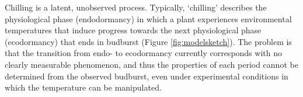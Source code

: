 \documentclass[11pt]{article}
\begin{document}
Chilling is a latent, unobserved process. Typically, %
%
`chilling' describes the physiological phase (endodormancy) in which a plant experiences environmental temperatures that induce progress towards the next physiological phase (ecodormancy) that ends in budburst (Figure \ref{fig:modelsketch}). The problem is that the transition from endo- to ecodormancy currently corresponds with no clearly measurable phenomenon, and thus the properties of each period cannot be determined from the observed budburst, even under experimental conditions in which the temperature can be manipulated. 
\end{document}
